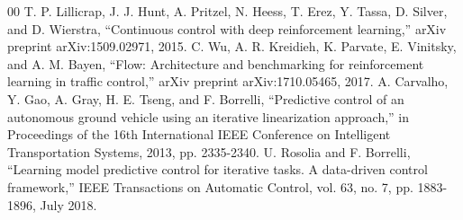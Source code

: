 \documentclass[conference,onecolumn,draftclsnofoot]{IEEEtran}
\begin{document}
\begin{thebibliography}{00}
 T. P. Lillicrap, J. J. Hunt, A. Pritzel, N. Heess, T. Erez, Y. Tassa, D. Silver, and D. Wierstra, ``Continuous control with deep reinforcement learning,'' arXiv preprint arXiv:1509.02971, 2015.
 C. Wu, A. R. Kreidieh, K. Parvate, E. Vinitsky, and A. M. Bayen, ``Flow: Architecture and benchmarking for reinforcement learning in traffic control,'' arXiv preprint arXiv:1710.05465, 2017.
 A. Carvalho, Y. Gao, A. Gray, H. E. Tseng, and F. Borrelli, ``Predictive control of an autonomous ground vehicle using an iterative linearization approach,'' in Proceedings of the 16th International IEEE Conference on Intelligent Transportation Systems, 2013, pp. 2335-2340.
 U. Rosolia and F. Borrelli, ``Learning model predictive control for iterative tasks. A data-driven control framework,'' IEEE Transactions on Automatic Control, vol. 63, no. 7, pp. 1883-1896, July 2018.
\end{thebibliography}
\end{document}
